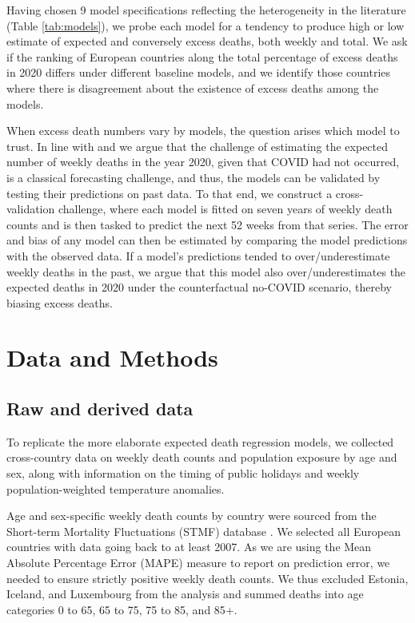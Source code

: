 \documentclass[12pt]{article}
\begin{document}
Having chosen 9 model specifications reflecting the heterogeneity in the literature (Table \ref{tab:models}), we probe each model for a tendency to produce high or low estimate of expected and conversely excess deaths, both weekly and total. We ask if the ranking of European countries along the total percentage of excess deaths in 2020 differs under different baseline models, and we identify those countries where there is disagreement about the existence of excess deaths among the models.

When excess death numbers vary by models, the question arises which model to trust. In line with \cite{Kontis2020} and \cite{Modi2020} we argue that the challenge of estimating the expected number of weekly deaths in the year 2020, given that COVID had not occurred, is a classical forecasting challenge, and thus, the models can be validated by testing their predictions on past data. To that end, we construct a cross-validation challenge, where each model is fitted on seven years of weekly death counts and is then tasked to predict the next 52 weeks from that series. The error and bias of any model can then be estimated by comparing the model predictions with the observed data. If a model's predictions tended to over/underestimate weekly deaths in the past, we argue that this model also over/underestimates the expected deaths in 2020 under the counterfactual no-COVID scenario, thereby biasing excess deaths.

\section*{Data and Methods}

\subsection*{Raw and derived data}

To replicate the more elaborate expected death regression models, we collected cross-country data on weekly death counts and population exposure by age and sex, along with information on the timing of public holidays and weekly population-weighted temperature anomalies.


Age and sex-specific weekly death counts by country were sourced from the Short-term Mortality Fluctuations (STMF) database \citep{Jdanov2021, Nemeth2021}. We selected all European countries with data going back to at least 2007. As we are using the Mean Absolute Percentage Error (MAPE) measure to report on prediction error, we needed to ensure strictly positive weekly death counts. We thus excluded Estonia, Iceland, and Luxembourg from the analysis and summed deaths into age categories 0 to 65, 65 to 75, 75 to 85, and 85+.
\end{document}
